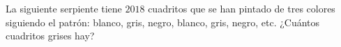 La siguiente serpiente tiene $2018$ cuadritos que se han pintado de tres colores siguiendo el patrón: blanco, gris, negro, blanco, gris, negro, etc. ¿Cuántos cuadritos grises hay?